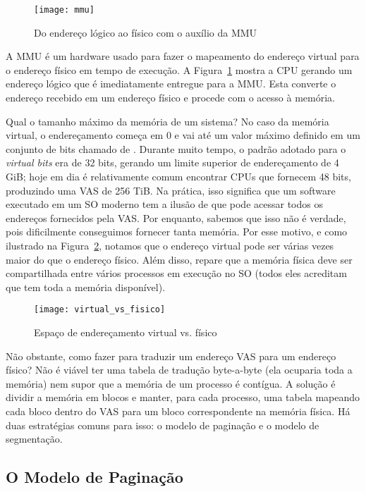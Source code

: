 \begin{figure}[!h]
  \centering
  \texttt{[image: mmu]} 
  \caption{Do endereço lógico ao físico com o auxílio da MMU}
  \label{fig:mmu}
\end{figure}

A MMU é um hardware usado para fazer o mapeamento do endereço virtual para o
endereço físico em tempo de execução. A Figura~\ref{fig:mmu} mostra a CPU
gerando um endereço lógico que é imediatamente entregue para a MMU. Esta
converte o endereço recebido em um endereço físico e procede com o acesso à
memória.

Qual o tamanho máximo da memória de um sistema?  No caso da memória virtual, o
endereçamento começa em 0 e vai até um valor máximo definido em um conjunto de
bits chamado de . Durante muito tempo, o padrão
adotado para o \emph{virtual bits} era de 32 bits, gerando um limite superior
de endereçamento de 4 GiB; hoje em dia é relativamente comum encontrar CPUs que
fornecem 48 bits, produzindo uma VAS de 256 TiB. Na prática, isso significa
que um software executado em um SO moderno tem a ilusão de que pode acessar
todos os endereços fornecidos pela VAS. Por enquanto, sabemos que isso não é
verdade, pois dificilmente conseguimos fornecer tanta memória. Por esse motivo,
e como ilustrado na Figura~\ref{fig:vas_pas}, notamos que o endereço virtual
pode ser várias vezes maior do que o endereço físico. Além disso, repare que a
memória física deve ser compartilhada entre vários processos em execução no SO
(todos eles acreditam que tem toda a memória disponível).

\begin{figure}[!h]
  \centering
  \texttt{[image: virtual\_vs\_fisico]} 
  \caption{Espaço de endereçamento virtual vs. físico}
  \label{fig:vas_pas}
\end{figure}


Não obstante, como fazer para traduzir um endereço VAS para um endereço físico?
Não é viável ter uma tabela de tradução byte-a-byte (ela ocuparia toda a
memória) nem supor que a memória de um processo é contígua. A solução é
dividir a memória em blocos e manter, para cada processo, uma tabela mapeando
cada bloco dentro do VAS para um bloco correspondente na memória física. Há
duas estratégias comuns para isso: o modelo de paginação e o modelo de
segmentação.

\subsection{O Modelo de Paginação}
\label{sec:modelopaginacao}

